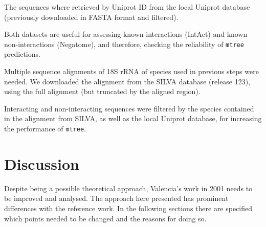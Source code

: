 \documentclass[11pt]{article}
\begin{document}
The sequences where retrieved by Uniprot ID from the local Uniprot database (previously downloaded in FASTA format and filtered). 

Both datasets are useful for assessing known interactions (IntAct) and known non-interactions (Negatome), and therefore, checking the reliability of \texttt{mtree} predictions.

Multiple sequence alignments of 18S rRNA of species used in previous steps were needed. We downloaded the alignment from the SILVA database\cite{SILVA} (release 123), using the full alignment (but truncated by the aligned region).

Interacting and non-interacting sequences were filtered by the species contained in the alignment from SILVA, as well as the local Uniprot database, for increasing the performance of \texttt{mtree}.



\section{Discussion}
Despite being a possible theoretical approach, Valencia's work in 2001\cite{Pazos2001} needs to be improved and analysed. The approach here presented has prominent differences with the reference work. In the following sections there are specified which points needed to be changed and the reasons for doing so.
\end{document}
